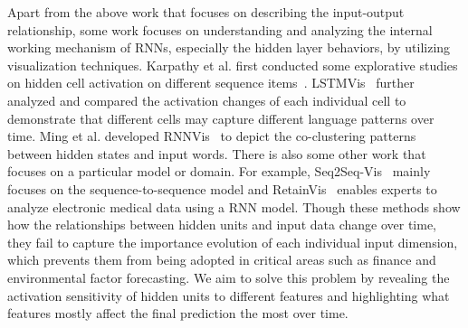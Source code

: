 Apart from the above work that focuses on describing the input-output relationship,
some work focuses on understanding and analyzing the internal working mechanism of RNNs, especially the hidden layer behaviors, by utilizing visualization techniques.
Karpathy et al. first conducted some explorative studies on hidden cell activation on different sequence items~\cite{karpathy2015visualizing}.
LSTMVis~\cite{strobelt2018lstmvis} further analyzed and compared the activation changes of each individual cell to demonstrate that different cells may capture different language patterns over time.
Ming et al. developed RNNVis~\cite{ming2017understanding} to depict the co-clustering patterns between hidden states and input words.
There is also some other work that focuses on a particular model or domain.
For example, Seq2Seq-Vis~\cite{strobelt2019s} mainly focuses on the sequence-to-sequence model and RetainVis~\cite{kwon2019retainvis} enables experts to analyze electronic medical data using a RNN model.
Though these methods show how the relationships between hidden units and input data change over time, they fail to capture the importance evolution of each individual input dimension, which prevents them from being adopted in critical areas such as finance and environmental factor forecasting.
We aim to solve this problem by revealing the activation sensitivity of hidden units to different features and highlighting what features mostly affect the final prediction the most over time.

